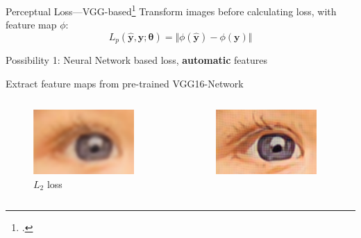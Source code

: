 \documentclass{beamer}
\begin{document}
\begin{frame}{Perceptual Loss---VGG-based\footcite{PerceptualLoss}}
Transform images before calculating loss, with feature map $\phi$:
\begin{equation*}
    L_p( \hat{\bm{y}}, \bm{y}; \bm{\theta}) = \Vert \phi( \bm{\hat{y}} ) - \phi( \bm{y}) \Vert
\end{equation*}

  \alert{Possibility 1}: Neural Network based loss, \textbf{automatic} features

  Extract feature maps from pre-trained VGG16-Network
\begin{columns}
  \begin{column}{0.33\linewidth}
    \begin{figure}[h]
      \centering
        \includegraphics[width=0.9\textwidth]{perceptual_loss_l2}
      \caption*{$L_2$ loss}
    \end{figure}
  \end{column}
  \begin{column}{0.33\linewidth}
    \begin{figure}[h]
      \centering
        \includegraphics[width=0.9\textwidth]{perceptual_loss_vgg}

\end{figure}
\end{column}
\end{columns}
\end{frame}
\end{document}

